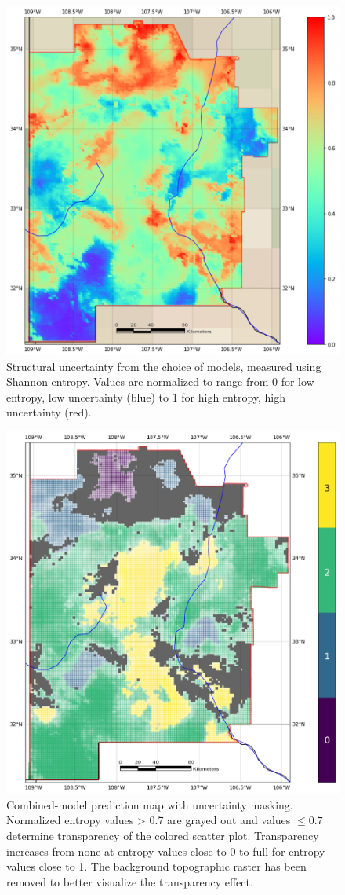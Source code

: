 \begin{figure}
\centering
\includegraphics[width=.75\textwidth]{templates/images/Figure-Structural_Entropy_Map.png}
\caption[Structural uncertainty map]{Structural uncertainty from the choice of models, measured using Shannon entropy. Values are normalized to range from 0 for low entropy, low uncertainty (blue) to 1 for high entropy, high uncertainty (red).}
\label{fig:structural_entropy_map}
\end{figure}

\begin{figure}
\centering
\includegraphics[width=.75\textwidth]{templates/images/Figure-Masked_Average_Gradient_Map.png}
\caption[Structural uncertainty mask on prediction map]{Combined-model prediction map with uncertainty masking. Normalized entropy values > 0.7 are grayed out and values $\leq0.7$ determine transparency of the colored scatter plot. Transparency increases from none at entropy values close to 0 to full for entropy values close to 1. The background topographic raster has been removed to better visualize the transparency effect.}
\label{fig:avg_gradient_masked_map}
\end{figure}

